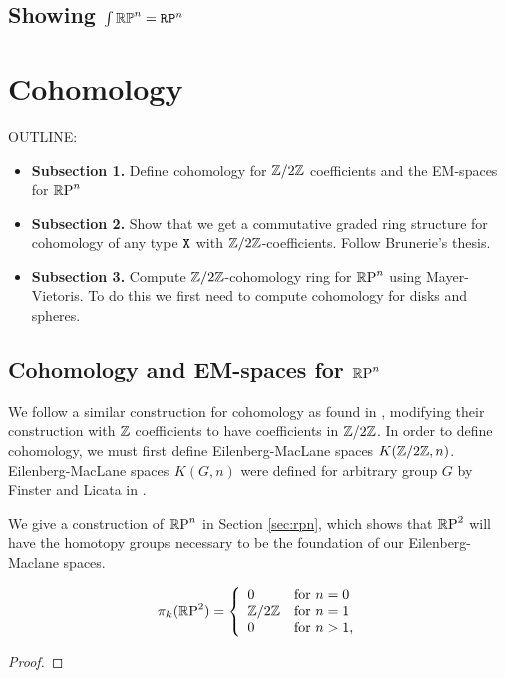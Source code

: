 \documentclass{amsart}
\begin{document}
\subsection{Showing $ \int \mathbb{RP}^n = \mathtt{RP}^n $}


\section{Cohomology}
\label{sec:cohom}

OUTLINE:
\begin{itemize}
\item 
  \textbf{Subsection 1.} 
  Define cohomology for $ \mathbb{Z}/2\mathbb{Z} $ coefficients and the
  EM-spaces for $ \mathbb{R}\textrm{P}^n $
\item
  \textbf{Subsection 2.} Show that we get a commutative
  graded ring structure for cohomology of any type $ \mathtt{X} $
  with $ \mathbb{Z}/2\mathbb{Z} $-coefficients. Follow Brunerie's thesis.
\item
  \textbf{Subsection 3.} Compute $ \mathbb{Z}/2\mathbb{Z} $-cohomology ring
  for $ \mathbb{R}\textrm{P}^n $ using Mayer-Vietoris.  To do this we 
  first need to compute cohomology for disks and spheres.  
\end{itemize}


\subsection{Cohomology and EM-spaces for $\mathbb{R}\textrm{P}^n$}


We follow a similar construction for cohomology as found in \cite{brunerie:thesis}, modifying their construction with $\mathbb{Z}$ coefficients to have coefficients in $\mathbb{Z}/2\mathbb{Z}$. In order to define cohomology, we must first define Eilenberg-MacLane spaces $K(\mathbb{Z}/2\mathbb{Z},n)$. Eilenberg-MacLane spaces $K(G,n)$ were defined for arbitrary group $G$ by Finster and Licata in \cite{fl:em}.

We give a construction of $\mathbb{R}\textrm{P}^n$ in Section \ref{sec:rpn}, which shows that $\mathbb{R}\textrm{P}^2$ will have the homotopy groups necessary to be the foundation of our Eilenberg-Maclane spaces. 
\begin{proposition}\label{prop:rpnhtpygps} %
	\[ \pi_k(\mathbb{R}\textrm{P}^2)=\left\{ \begin{array}{ll} 0 & \text{for }n=0\\
	\mathbb{Z}/2\mathbb{Z} & \text{for } n=1\\
	0 & \text{for } n> 1, 
	\end{array}\right.\]
\end{proposition}
\begin{proof}
\end{proof}
\end{document}
